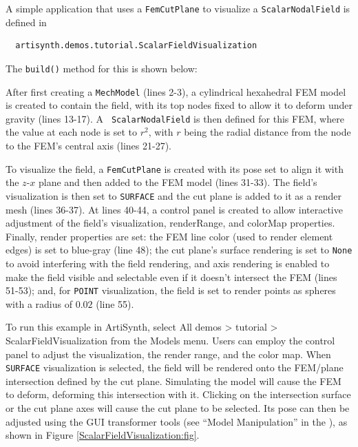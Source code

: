 A simple application that uses a {\tt FemCutPlane} to visualize a
{\tt ScalarNodalField} is defined in
%
\begin{verbatim}
  artisynth.demos.tutorial.ScalarFieldVisualization
\end{verbatim}
%
The {\tt build()} method for this is shown below:
\lstset{numbers=left}
\iflatexml

\else

\fi
\lstset{numbers=none}
%
After first creating a {\tt MechModel} (lines 2-3), a cylindrical
hexahedral FEM model is created to contain the field, with its top
nodes fixed to allow it to deform under gravity (lines 13-17). A {\tt
ScalarNodalField} is then defined for this FEM, where the value at
each node is set to $r^2$, with $r$ being the radial distance from the
node to the FEM's central axis (lines 21-27).

To visualize the field, a {\tt FemCutPlane} is created with its pose
set to align it with the $z$-$x$ plane and then added to the FEM model
(lines 31-33). The field's visualization is then set to {\tt SURFACE}
and the cut plane is added to it as a render mesh (lines 36-37).  At
lines 40-44, a control panel is created to allow interactive
adjustment of the field's {\sf visualization}, {\sf renderRange}, and
{\sf colorMap} properties. Finally, render properties are set: the FEM
line color (used to render element edges) is set to blue-gray (line
48); the cut plane's surface rendering is set to {\tt None} to avoid
interfering with the field rendering, and axis rendering is enabled to
make the field visible and selectable even if it doesn't intersect the
FEM (lines 51-53); and, for {\tt POINT} visualization, the field is
set to render points as spheres with a radius of $0.02$ (line 55).

To run this example in ArtiSynth, select {\sf All demos > tutorial >
ScalarFieldVisualization} from the {\sf Models} menu. Users can employ
the control panel to adjust the visualization, the render range, and
the color map. When {\tt SURFACE} visualization is selected, the field
will be rendered onto the FEM/plane intersection defined by the cut
plane. Simulating the model will cause the FEM to deform, deforming
this intersection with it. Clicking on the intersection surface or the
cut plane axes will cause the cut plane to be selected. Its pose can
then be adjusted using the GUI transformer tools (see ``Model
Manipulation'' in the ), as shown in
Figure \ref{ScalarFieldVisualization:fig}.

